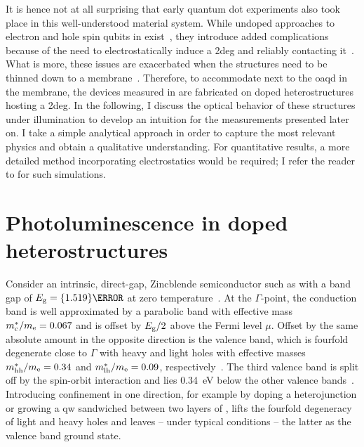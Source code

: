 It is hence not at all surprising that early quantum dot experiments also took place in this well-understood material system.
While undoped approaches to electron and hole spin qubits in  exist~\cite{Harrell1999,Chen2012,Li2014,Tracy2014}, they introduce added complications because of the need to electrostatically induce a \gls{2deg} and reliably contacting it~\cite{Rossler2016}.
What is more, these issues are exacerbated when the structures need to be thinned down to a membrane~\cite{Descamps2021,Kindel2026}.
Therefore, to accommodate  next to the \acrfull{oaqd} in the membrane, the devices measured in \thispart are fabricated on doped heterostructures hosting a \gls{2deg}.
In the following, I discuss the optical behavior of these structures under illumination to develop an intuition for the measurements presented later on.
I take a simple analytical approach in order to capture the most relevant physics and obtain a qualitative understanding.
For quantitative results, a more detailed method incorporating electrostatics would be required; I refer the reader to  for such simulations.

\section{Photoluminescence in doped \texorpdfstring{\GaAsAlGaAs}{} heterostructures}\label{sec:exp:theory:pl}
Consider an intrinsic, direct-gap, Zincblende semiconductor such as  with a band gap of $E_{\mr{g}} = \qty{1.519}{\electronvolt}$ at zero temperature~\cite{Vurgaftman2001}.
At the $\Gamma$-point, the conduction band is well approximated by a parabolic band with effective mass $m^\ast_{\mathrm{c}}/m_{\mathrm{e}} = 0.067$ and is offset by $E_{\mathrm{g}}/2$ above the Fermi level $\mu$.
Offset by the same absolute amount in the opposite direction is the valence band, which is fourfold degenerate close to $\Gamma$ with heavy and light holes with effective masses $m^{\ast}_{\mathrm{hh}}/m_{\mathrm{e}} = 0.34$ and $m^{\ast}_{\mathrm{lh}}/m_{\mathrm{e}} = 0.09$, respectively~\cite{Miller1984a}.
The third valence band
is split off by the spin-orbit interaction and lies \qty{0.34}{\electronvolt} below the other valence bands~\cite{Davies2009}.
Introducing confinement in one direction, for example by doping a \GaAsAlGaAs heterojunction or growing a  \acrfull{qw} sandwiched between two layers of , lifts the fourfold degeneracy of light and heavy holes and leaves -- under typical conditions -- the latter as the valence band ground state.

